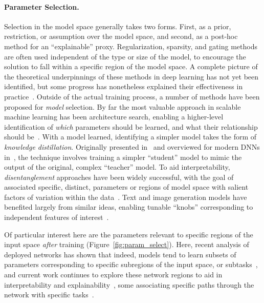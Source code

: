 \paragraph{Parameter Selection.} 
Selection in the model space generally takes two forms. First, as a prior, restriction, or assumption over the model space, and second, as a post-hoc method for an ``explainable'' proxy.
Regularization, sparsity, and gating methods are often used independent of the type or size of the model, to encourage the solution to fall within a specific region of the model space.
A complete picture of the theoretical underpinnings of these methods in deep learning has not yet been identified, but some progress has nonetheless explained their effectiveness in practice~\citep{hardt2016train,jacot2018neural,neyshabur2014search}.
Outside of the actual training process,
a number of methods have been proposed for \textit{model} selection.
By far the most valuable approach in scalable machine learning has been architecture search, enabling a higher-level identification of \textit{which} parameters should be learned, and what their relationship should be~\citep{elsken2019neural}.
With a model learned, identifying a simpler model takes the form of \textit{knowledge distillation}.
Originally presented in~\cite{hintondistill} and overviewed for modern DNNs in~\cite{gou2021knowledge}, the technique involves training a simpler ``student'' model to mimic the output of the original, complex ``teacher'' model.
To aid interpretability, \textit{disentanglement} approaches have been widely successful,
with the goal of associated specific, distinct, parameters or regions of model space with salient factors of variation within the data~\citep{creager2019flexibly,locatello2019challenging}.
Text and image generation models have benefited largely from similar ideas, enabling tunable ``knobs'' corresponding to independent features of interest~\citep{higgins2017betavae,karras2019style,hjelm2018learning}.

Of particular interest here are the parameters relevant to specific regions of the input space \textit{after} training (Figure~\ref{fig:param_select}). 
Here, recent analysis of deployed networks has shown that indeed, models tend to learn subsets of parameters corresponding to specific subregions of the input space, or subtasks~\citep{bau2017network,fong2018net2vec}, and current work continues to explore these network regions to aid in interpretability and explainability~\citep{netdissect,yiyou}, some associating specific paths through the network with specific tasks~\citep{geigerinducing,elhage2021mathematical}.


